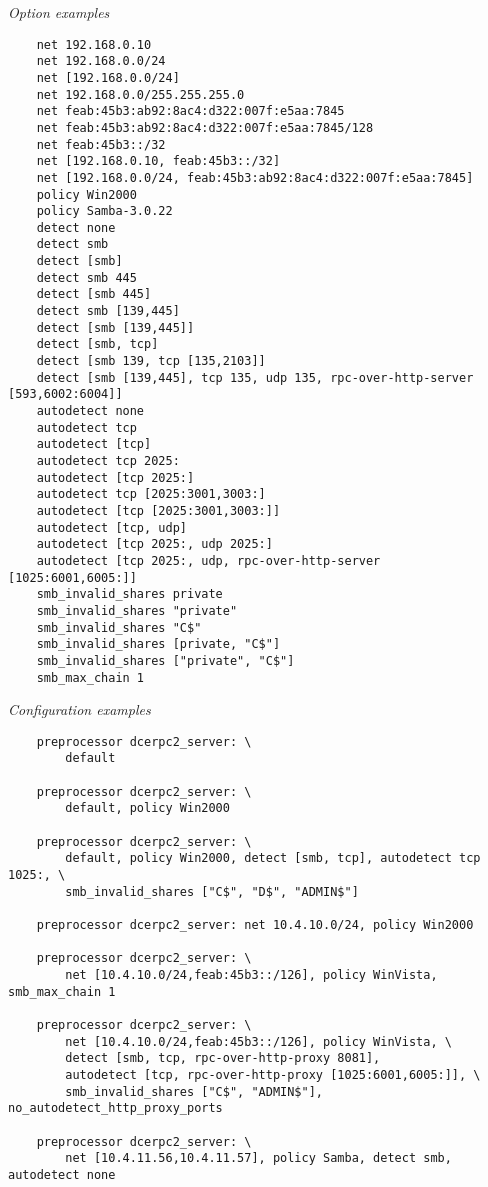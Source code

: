 \documentclass[english]{report}
\begin{document}
\textit{Option examples}
\footnotesize
\begin{verbatim}
    net 192.168.0.10
    net 192.168.0.0/24
    net [192.168.0.0/24]
    net 192.168.0.0/255.255.255.0
    net feab:45b3:ab92:8ac4:d322:007f:e5aa:7845
    net feab:45b3:ab92:8ac4:d322:007f:e5aa:7845/128
    net feab:45b3::/32
    net [192.168.0.10, feab:45b3::/32]
    net [192.168.0.0/24, feab:45b3:ab92:8ac4:d322:007f:e5aa:7845]
    policy Win2000
    policy Samba-3.0.22
    detect none
    detect smb
    detect [smb]
    detect smb 445
    detect [smb 445]
    detect smb [139,445]
    detect [smb [139,445]]
    detect [smb, tcp]
    detect [smb 139, tcp [135,2103]]
    detect [smb [139,445], tcp 135, udp 135, rpc-over-http-server [593,6002:6004]]
    autodetect none
    autodetect tcp
    autodetect [tcp]
    autodetect tcp 2025:
    autodetect [tcp 2025:]
    autodetect tcp [2025:3001,3003:]
    autodetect [tcp [2025:3001,3003:]]
    autodetect [tcp, udp]
    autodetect [tcp 2025:, udp 2025:]
    autodetect [tcp 2025:, udp, rpc-over-http-server [1025:6001,6005:]]
    smb_invalid_shares private
    smb_invalid_shares "private"
    smb_invalid_shares "C$"
    smb_invalid_shares [private, "C$"]
    smb_invalid_shares ["private", "C$"]
    smb_max_chain 1
\end{verbatim}
\normalsize

\textit{Configuration examples}
\footnotesize
\begin{verbatim}
    preprocessor dcerpc2_server: \
        default

    preprocessor dcerpc2_server: \
        default, policy Win2000

    preprocessor dcerpc2_server: \
        default, policy Win2000, detect [smb, tcp], autodetect tcp 1025:, \
        smb_invalid_shares ["C$", "D$", "ADMIN$"]

    preprocessor dcerpc2_server: net 10.4.10.0/24, policy Win2000

    preprocessor dcerpc2_server: \
        net [10.4.10.0/24,feab:45b3::/126], policy WinVista, smb_max_chain 1

    preprocessor dcerpc2_server: \
        net [10.4.10.0/24,feab:45b3::/126], policy WinVista, \
        detect [smb, tcp, rpc-over-http-proxy 8081], 
        autodetect [tcp, rpc-over-http-proxy [1025:6001,6005:]], \
        smb_invalid_shares ["C$", "ADMIN$"], no_autodetect_http_proxy_ports

    preprocessor dcerpc2_server: \
        net [10.4.11.56,10.4.11.57], policy Samba, detect smb, autodetect none
\end{verbatim}
\normalsize
\end{document}
